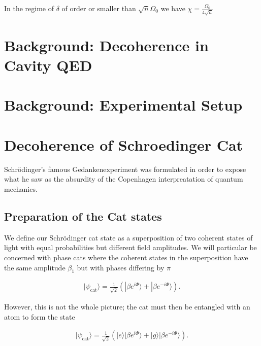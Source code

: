 \documentclass[aps,prl,twocolumn,amsmath,amssymb]{revtex4}
\begin{document}
In the regime of $\delta$ of order or smaller than $\sqrt{\bar{n}} \Omega_0$ we have  $\chi = \frac{\Omega_0}{4 \sqrt{\bar{n}}}$


\section{\label{sec:level1}Background: Decoherence in Cavity QED}

\section{\label{sec:level1}Background: Experimental Setup}

\section{\label{sec:level1}Decoherence of Schroedinger Cat}

Schrödinger's famous Gedankenexperiment was formulated in order to expose what he saw as the absurdity of the Copenhagen interpreatation of quantum mechanics.  

\subsection{\label{sec:level1}Preparation of the Cat states}


We define our Schrödinger cat state as a superposition of two coherent states of light with equal probabilities but different field amplitudes. We will particular be concerned with phase cats where the coherent states in the superposition have the same amplitude $\beta_1$ but with phases differing by $\pi$

\begin{align}
|\psi_{\mathrm{cat}}\rangle = \frac{1}{\sqrt{2}} (|\beta e^{i\Phi}\rangle+|\beta e^{-i\Phi}\rangle)
\label{eq:cat1}.
\end{align}

However, this is not the whole picture; the cat must then be entangled with an atom to form the state

\begin{align}
|\psi_{\mathrm{cat}}\rangle = \frac{1}{\sqrt{2}} (|e\rangle|\beta e^{i\Phi}\rangle+|g\rangle|\beta e^{-i\Phi}\rangle)
\label{eq:cat2}.
\end{align}
\end{document}
